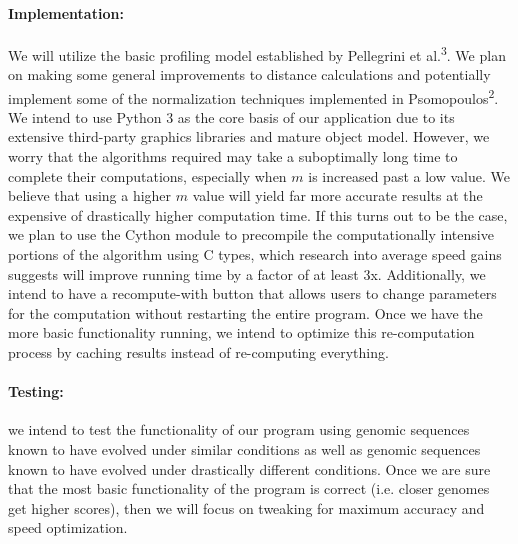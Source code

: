 \documentclass[11pt, oneside]{article}
\begin{document}
\paragraph
{\bfseries Implementation:}  We will utilize the basic profiling model established by Pellegrini et al.\textsuperscript{3}. We plan on making some general improvements to distance calculations and potentially implement some of the normalization techniques implemented in Psomopoulos\textsuperscript{2}. We intend to use Python 3 as the core basis of our application due to its extensive third-party graphics libraries and mature object model. However, we worry that the algorithms required may take a suboptimally long time to complete their computations, especially when $m$ is increased past a low value. We believe that using a higher $m$ value will yield far more accurate results at the expensive of drastically higher computation time. If this turns out to be the case, we plan to use the Cython module to precompile the computationally intensive portions of the algorithm using C types, which research into average speed gains suggests will improve running time by a factor of at least 3x. Additionally, we intend to have a recompute-with button that allows users to change parameters for the computation without restarting the entire program. Once we have the more basic functionality running, we intend to optimize this re-computation process by caching results instead of re-computing everything.

\paragraph
{\bfseries Testing:} we intend to test the functionality of our program using genomic sequences known to have evolved under similar conditions as well as genomic sequences known to have evolved under drastically different conditions. Once we are sure that the most basic functionality of the program is correct (i.e. closer genomes get higher scores), then we will focus on tweaking for maximum accuracy and speed optimization.
\end{document}
